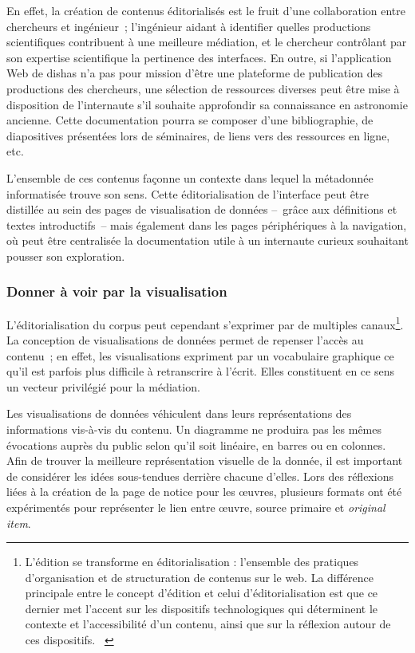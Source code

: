 \documentclass[a4paper,12pt,twoside]{book}
\newcommand{\eng}{\emph}
\newcommand{\oi}{\eng{original item}\xspace}
\newcommand{\g}[1]{\og#1~\fg}
\newcommand{\dishas}{\gls{dishas}\xspace}
\begin{document}
En effet, la création de contenus éditorialisés est le fruit d'une collaboration entre chercheurs et ingénieur~; l'ingénieur aidant à identifier quelles productions scientifiques contribuent à une meilleure médiation, et le chercheur contrôlant par son expertise scientifique la pertinence des interfaces. En outre, si l'application Web de \dishas n'a pas pour mission d'être une plateforme de publication des productions des chercheurs, une sélection de ressources diverses peut être mise à disposition de l'internaute s'il souhaite approfondir sa connaissance en astronomie ancienne. Cette documentation pourra se composer d'une bibliographie, de diapositives présentées lors de séminaires, de liens vers des ressources en ligne, etc.

L'ensemble de ces contenus façonne un contexte dans lequel la métadonnée informatisée trouve son sens. Cette éditorialisation de l'interface peut être distillée au sein des pages de visualisation de données –~grâce aux définitions et textes introductifs~– mais également dans les pages périphériques à la navigation, où peut être centralisée la documentation utile à un internaute curieux souhaitant pousser son exploration.

			\subsubsection{Donner à voir par la visualisation}
L'éditorialisation du corpus peut cependant s'exprimer par de multiples canaux\footnote{\g{L’édition se transforme en éditorialisation : l’ensemble des pratiques d’organisation et de structuration de contenus sur le web. La différence principale entre le concept d’édition et celui d’éditorialisation est que ce dernier met l’accent sur les dispositifs technologiques qui déterminent le contexte et l’accessibilité d’un contenu, ainsi que sur la réflexion autour de ces dispositifs.} \cite[§~20]{sinatraChapitreHistoireHumanites2014}}. La conception de visualisations de données permet de repenser l'accès au contenu~; en effet, les visualisations expriment par un vocabulaire graphique ce qu'il est parfois plus difficile à retranscrire à l'écrit. Elles constituent en ce sens un vecteur privilégié pour la médiation.

Les visualisations de données véhiculent dans leurs représentations des informations vis-à-vis du contenu. Un diagramme ne produira pas les mêmes évocations auprès du public selon qu'il soit linéaire, en barres ou en colonnes. Afin de trouver la meilleure représentation visuelle de la donnée, il est important de considérer les idées sous-tendues derrière chacune d'elles. Lors des réflexions liées à la création de la page de notice pour les œuvres, plusieurs formats ont été expérimentés pour représenter le lien entre œuvre, source primaire et \oi.
\end{document}
